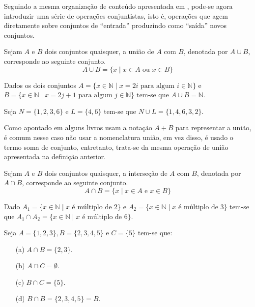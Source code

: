 Seguindo a mesma organização de conteúdo apresentada em \cite{lipschutz2013-MD}, pode-se agora introduzir uma série de operações conjuntistas, isto é, operações que agem diretamente sobre conjuntos de ``entrada'' produzindo como ``saída'' novos conjuntos.

\begin{definition}\label{def:UniaoConjuntos}
	Sejam $A$ e $B$ dois conjuntos quaisquer, a união de $A$ com $B$, denotada por $A \cup B$, corresponde ao seguinte conjunto.
	$$A \cup B = \{x \mid x \in A \mbox{ ou } x \in B\}$$
\end{definition}

\begin{example}\label{exe:UniaoDeConjuntos1}
	Dados os dois conjuntos $A = \{x \in \mathbb{N} \mid x = 2i \mbox{ para algum } i \in \mathbb{N}\}$ e $B = \{x \in \mathbb{N} \mid x = 2j + 1 \mbox{ para algum } j \in \mathbb{N}\}$ tem-se que $A \cup B = \mathbb{N}$.
\end{example}

\begin{example}\label{exe:UniaoDeConjuntos2}
	Seja $N = \{1, 2, 3, 6\}$ e $L = \{4, 6\}$ tem-se que $N \cup L = \{1, 4, 6, 3, 2\}$.
\end{example}

Como apontado em \cite{lipschutz1978-TC} alguns livros usam a notação $A + B$ para representar a união, é comum nesse caso não usar a nomenclatura união, em vez disso, é usado o termo soma de conjunto, entretanto, trata-se da mesma operação de união apresentada na definição anterior.

\begin{definition}\label{def:IntersecaoConjuntos}
	Sejam $A$ e $B$ dois conjuntos quaisquer, a interseção de $A$ com $B$, denotada por $A \cap B$, corresponde ao seguinte conjunto.
	$$A \cap B = \{x \mid x \in A \mbox{ e } x \in B\}$$
\end{definition}

\begin{example}\label{exe:IntersecaoDeConuuntos1}
	Dado $A_1 = \{x \in \mathbb{N} \mid x \mbox{ é múltiplo de } 2\}$ e $A_2 = \{x \in \mathbb{N} \mid x \mbox{ é múltiplo de } 3\}$ tem-se que $A_1 \cap A_2 = \{x \in \mathbb{N} \mid x \mbox{ é múltiplo de } 6\}$.
\end{example}

\begin{example}\label{exe:IntersecaoDeConuuntos2}
	Seja $A = \{1, 2, 3\}, B = \{2, 3, 4, 5\}$ e $C = \{5\}$ tem-se que:
	\begin{itemize}
		\item[(a)] $A \cap B = \{2, 3\}$.
		\item[(b)] $A \cap C = \emptyset$.
		\item[(c)] $B \cap C = \{5\}$.
		\item[(d)] $B \cap B = \{2, 3, 4, 5\} = B$.
	\end{itemize}
\end{example}

